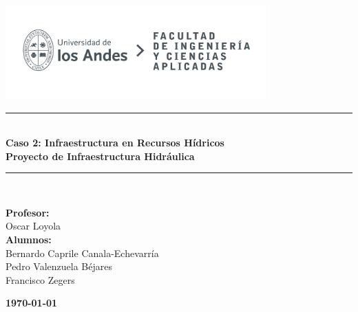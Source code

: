 \documentclass{article} %
\begin{document}
\begin{titlepage}%
\newcommand{\HRule}{\rule{\linewidth}{0.5mm}} 
\center 
\includegraphics[width=10cm]{LOGO_UNIVERSIDAD.jpg}\\ %
\vspace{3cm}
\HRule \\[0.4cm]
{ \huge \bfseries Caso 2: Infraestructura en Recursos Hídricos}\\[0.4cm] %
{ \huge \bfseries Proyecto de Infraestructura Hidráulica}\\[0.4cm] %
\HRule \\[1.5cm]
 \vspace{5cm}
\begin{flushright}
    { \textbf{Profesor:}\\
    Oscar Loyola\\
    \vspace{0.2cm}
    \textbf{Alumnos:}\\
    Bernardo Caprile Canala-Echevarría\\
    Pedro Valenzuela Béjares\\
    Francisco Zegers
    \vspace{0.2cm}

}
\end{flushright}
\vspace{1cm}
{\large \textbf{\today}}\\[2cm] %
\end{titlepage}
\end{document}
